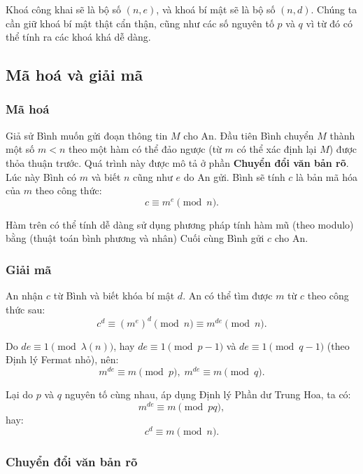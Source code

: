 Khoá công khai sẽ là bộ số $(n,e)$, và khoá bí mật sẽ là bộ số $(n,d)$. Chúng ta cần giữ khoá bí mật thật cẩn thận, cũng như các số nguyên tố $p$ và $q$ vì từ đó có thể tính ra các khoá khá dễ dàng.

\subsection{Mã hoá và giải mã}

\subsubsection*{Mã hoá}

Giả sử Bình muốn gửi đoạn thông tin $M$ cho An. Đầu tiên Bình chuyển $M$ thành một số $m<n$ theo một hàm có thể đảo ngược (từ $m$ có thể xác định lại $M$) được thỏa thuận trước. Quá trình này được mô tả ở phần \textbf{Chuyển đổi văn bản rõ}.\\

Lúc này Bình có $m$ và biết $n$ cũng như $e$ do An gửi. Bình sẽ tính $c$ là bản mã hóa của $m$ theo công thức:
$$
c\equiv m^e\pmod{n}.
$$

Hàm trên có thể tính dễ dàng sử dụng phương pháp tính hàm mũ (theo modulo) bằng (thuật toán bình phương và nhân) Cuối cùng Bình gửi $c$ cho An.

\subsubsection*{Giải mã}

An nhận $c$ từ Bình và biết khóa bí mật $d$. An có thể tìm được $m$ từ $c$ theo công thức sau:
$$
c^d\equiv(m^e)^d\pmod{n}\equiv m^{de}\pmod{n}.
$$

Do $de\equiv 1\pmod{\lambda(n)}$, hay $de\equiv1\pmod{p-1}$ và $de\equiv1\pmod{q-1}$ (theo Định lý Fermat nhỏ), nên:
$$
m^{de}\equiv m\pmod{p},\;m^{de}\equiv m\pmod{q}.
$$

Lại do $p$ và $q$ nguyên tố cùng nhau, áp dụng Định lý Phần dư Trung Hoa, ta có:
$$
m^{de}\equiv m\pmod{pq},
$$
hay:
$$
c^d\equiv m\pmod{n}.
$$

\subsubsection*{Chuyển đổi văn bản rõ}


